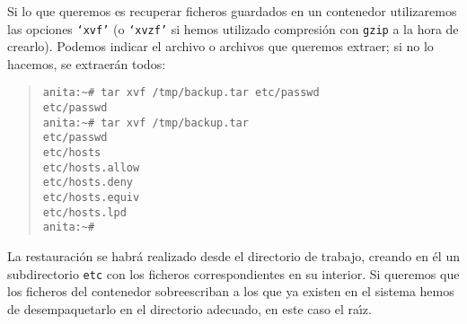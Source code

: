Si lo que queremos es recuperar ficheros guardados en un contenedor 
utilizaremos las opciones {\tt `xvf'} (o {\tt `xvzf'} si hemos utilizado 
compresi\'on con {\tt gzip} a la hora de crearlo). Podemos indicar el archivo
o archivos que queremos extraer; si no lo hacemos, se extraer\'an todos:
\begin{quote}
\begin{verbatim}
anita:~# tar xvf /tmp/backup.tar etc/passwd
etc/passwd
anita:~# tar xvf /tmp/backup.tar
etc/passwd
etc/hosts
etc/hosts.allow
etc/hosts.deny
etc/hosts.equiv
etc/hosts.lpd
anita:~#
\end{verbatim}
\end{quote}
La restauraci\'on se habr\'a realizado desde el directorio de trabajo, creando
en \'el un subdirectorio {\tt etc} con los ficheros correspondientes en su
interior. Si queremos que los ficheros del contenedor sobreescriban a los que ya
existen en el sistema hemos de desempaquetarlo en el directorio adecuado, en
este caso el ra\'{\i}z.

